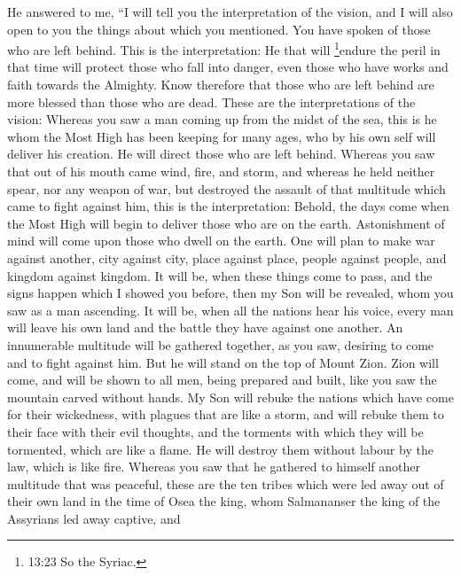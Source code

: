 He answered to me,  ``I will tell you the interpretation of
the vision, and I will also open to you the things about which you
mentioned.  You have spoken of those who are left behind.
This is the interpretation:  He that will \footnote{13:23
  So the Syriac.}endure the peril in that time will protect those who
fall into danger, even those who have works and faith towards the
Almighty.  Know therefore that those who are left behind
are more blessed than those who are dead.  These are the
interpretations of the vision: Whereas you saw a man coming up from the
midst of the sea,  this is he whom the Most High has been
keeping for many ages, who by his own self will deliver his creation. He
will direct those who are left behind.  Whereas you saw
that out of his mouth came wind, fire, and storm,  and
whereas he held neither spear, nor any weapon of war, but destroyed the
assault of that multitude which came to fight against him, this is the
interpretation:  Behold, the days come when the Most High
will begin to deliver those who are on the earth. 
Astonishment of mind will come upon those who dwell on the earth.
 One will plan to make war against another, city against
city, place against place, people against people, and kingdom against
kingdom.  It will be, when these things come to pass, and
the signs happen which I showed you before, then my Son will be
revealed, whom you saw as a man ascending.  It will be,
when all the nations hear his voice, every man will leave his own land
and the battle they have against one another.  An
innumerable multitude will be gathered together, as you saw, desiring to
come and to fight against him.  But he will stand on the
top of Mount Zion.  Zion will come, and will be shown to
all men, being prepared and built, like you saw the mountain carved
without hands.  My Son will rebuke the nations which have
come for their wickedness, with plagues that are like a storm,
 and will rebuke them to their face with their evil
thoughts, and the torments with which they will be tormented, which are
like a flame. He will destroy them without labour by the law, which is
like fire.  Whereas you saw that he gathered to himself
another multitude that was peaceful,  these are the ten
tribes which were led away out of their own land in the time of Osea the
king, whom Salmananser the king of the Assyrians led away captive, and
